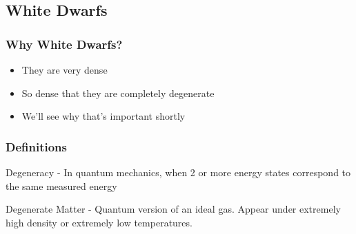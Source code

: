 \documentclass[handout]{beamer}
\begin{document}
        \subsection{White Dwarfs}

        \begin{frame}
            \frametitle{Why White Dwarfs?}

            \begin{itemize}
                \item They are very dense
                \pause
                \item So dense that they are completely degenerate
                \pause
                \item We'll see why that's important shortly
            \end{itemize}

        \end{frame}

        \begin{frame}
            \frametitle{Definitions}

            \begin{definition}
                \alert{Degeneracy} - In quantum mechanics, when 2 or more energy
                states correspond to the same measured energy
            \end{definition}

            \begin{definition}
                \alert{Degenerate Matter} - Quantum version of an ideal gas.
                Appear under extremely high density or extremely low
                temperatures.
            \end{definition}

        \end{frame}
\end{document}
